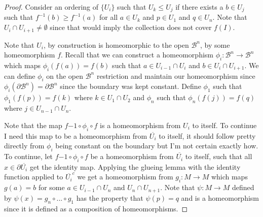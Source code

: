 \documentclass[minion]{homework651}
\begin{document}
\begin{problems}
\begin{proof}
    Consider an ordering of $\{U_i\}$ such that $U_k \leq U_j$ if there exists a $b\in U_j$ such that $f^{-1}(b) \geq f^{-1}(a)$ for all $a \in U_k$ and $p \in U_1$ and $q \in U_n$.
    Note that $U_{i} \cap U_{i+1} \neq \emptyset$ since that would imply the collection does not cover $f(I)$. 
    

    Note that $U_i$, by construction is homeomorphic to the open $\mathcal{B}^n$, by some homeomorphism $f$. Recall that we can construct a homeomorphism
    $\phi_i:\mathcal{B}^n \to \mathcal{B}^n$ which maps $\phi_i(f(a)) = f(b)$ such that $a \in U_{i - 1} \cap U_{i}$ and $b \in U_{i} \cap U_{i + 1}$. We can define 
    $\phi_i$ on the open $\mathcal{B}^n$ restriction and maintain our homeomorphism since $\phi_i(\partial \mathcal{B}^n) = \partial \mathcal{B}^n$ since the boundary was kept constant. 
    Define $\phi_1$ such that $\phi_1(f(p)) = f(k)$ where $k \in  U_{1} \cap U_{2}$ and $\phi_n$ such that $\phi_n(f(j)) = f(q)$ where $j \in U_{n - 1}\cap U_n$.

    
    Note that the map $f{-1}\circ \phi_i\circ f$ is a homeomorphism from $U_i$ to itself. To continue I need this map to be a homeomorphism from $\overline{U_i}$ to itself, it should 
    follow pretty directly from $\phi_i$ being constant on the boundary but I'm not certain exactly how.
    To continue, let $f{-1}\circ \phi_i\circ f$ be a homeomorphism from $\overline{U_i}$ to itself, such that all $x \in \partial\overline{U_i}$ get the identity map. 
    Applying the glueing lemma with the identity function applied to $\overline{U_i}^c$ we get a homeomorphism from $g_i: M \to M$ which maps $g(a) = b$ for some $a \in U_{i - 1} \cap U_n$
    and $U_n \cap U_{n+1}$. Note that $\psi: M \to M$ defined by $\psi(x) = g_n \circ ... \circ g_1$ has the property that $\psi(p)=q$ and is a homeomorphism since it is defined as a composition of homeomorphisms. 
   
   

\end{proof}

\end{problems}
\end{document}
